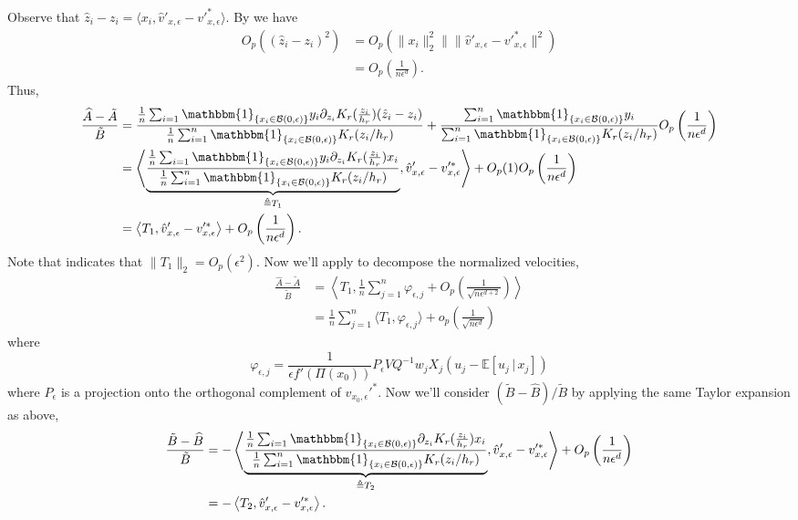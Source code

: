 \documentclass[11pt]{article}
\begin{document}
Observe that $\hat{z}_i - z_i = \langle x_i , \hat{v}'_{x, \epsilon} - v'^*_{x, \epsilon}\rangle$. By  we have
\begin{align*}
    O_p((\hat{z}_i - z_i)^2) &= O_p(\|x_i\|_2^2\|\|\hat{v}'_{x, \epsilon} - v'^*_{x, \epsilon}\|^2) \\
    &= O_p\left(\frac{1}{n\epsilon^{d}}\right).
\end{align*}
Thus,
\begin{align*}
    \frac{\widehat{A} - \tilde{A}}{\tilde{B}} &= \frac{\frac{1}{n}\sum_{i = 1}\mathbbm{1}_{\{x_i \in \mathcal{B}(0, \epsilon)\}}y_i\partial_{z_i}K_r(\frac{z_i}{h_r})(\hat{z}_i - z_i)}{\frac{1}{n}\sum_{i = 1}^n\mathbbm{1}_{\{x_i \in \mathcal{B}(0, \epsilon)\}}K_r(z_i/h_r)} + \frac{\sum_{i=1}^n\mathbbm{1}_{\{x_i \in \mathcal{B}(0, \epsilon)\}}y_i}{\sum_{i = 1}^n\mathbbm{1}_{\{x_i \in \mathcal{B}(0, \epsilon)\}}K_r(z_i/h_r)} O_p\left(\frac{1}{n\epsilon^{d}}\right) \\
    &= \left\langle\underbrace{\frac{\frac{1}{n}\sum_{i = 1}\mathbbm{1}_{\{x_i \in \mathcal{B}(0, \epsilon)\}}y_i\partial_{z_i}K_r(\frac{z_i}{h_r})x_i}{\frac{1}{n}\sum_{i = 1}^n\mathbbm{1}_{\{x_i \in \mathcal{B}(0, \epsilon)\}}K_r(z_i/h_r)}}_{\triangleq T_1}, \hat{v}'_{x, \epsilon} -v'^*_{x, \epsilon}\right\rangle + O_p(1)O_p\left(\frac{1}{n\epsilon^{d}}\right) \\
    &= \left\langle T_{1}, \hat{v}'_{x, \epsilon} -v'^*_{x, \epsilon}\right\rangle + O_p\left(\frac{1}{n\epsilon^{d}}\right).
\end{align*}
Note that  indicates that $\|T_1\|_2 = O_p(\epsilon^2)$. Now we'll apply  to decompose the normalized velocities,
\begin{align*}
    \frac{\widehat{A} - \tilde{A}}{\tilde{B}} &= \left\langle T_{1}, \frac{1}{n}\sum_{j = 1}^n\varphi_{\epsilon, j}  + O_p\left(\frac{1}{\sqrt{n\epsilon^{d+2}}}\right)\right\rangle \\
    &= \frac{1}{n}\sum_{j = 1}^n\langle T_{1}, \varphi_{\epsilon, j}\rangle + o_p\left(\frac{1}{\sqrt{n\epsilon^{d}}}\right)
\end{align*}
where 
\[\varphi_{\epsilon, j} = \frac{1}{\epsilon f'(\Pi(x_0))}P_{\epsilon}VQ^{-1}w_jX_j(u_j - \mathbb{E}[u_j \,|\, x_j])\]
where $P_{\epsilon}$ is a projection onto the orthogonal complement of $v_{x_0, \epsilon}'^{*}$.  Now we'll consider $(\tilde{B} - \widehat{B})/\tilde{B}$ by applying the same Taylor expansion as above,
\begin{align*}
    \frac{\tilde{B} - \widehat{B}}{\tilde{B}} &= -\left\langle\underbrace{\frac{\frac{1}{n}\sum_{i = 1}\mathbbm{1}_{\{x_i \in \mathcal{B}(0, \epsilon)\}}\partial_{z_i}K_r(\frac{z_i}{h_r})x_i}{\frac{1}{n}\sum_{i = 1}^n\mathbbm{1}_{\{x_i \in \mathcal{B}(0, \epsilon)\}}K_r(z_i/h_r)}}_{\triangleq T_2}, \hat{v}'_{x, \epsilon} -v'^*_{x, \epsilon}\right\rangle + O_p\left(\frac{1}{n\epsilon^{d}}\right)\\
    &= -\left\langle T_2, \hat{v}'_{x, \epsilon} -v'^*_{x, \epsilon}\right\rangle.
\end{align*}
\end{document}
